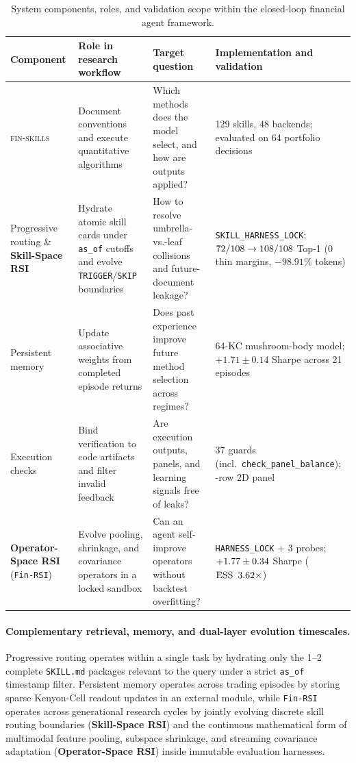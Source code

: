 \begin{table}[t]
\centering\small
\setlength{\tabcolsep}{5pt}
\begin{tabular}{p{}p{}p{}p{}}
\toprule
Component & Role in research workflow & Target question & Implementation and validation \\
\midrule
\textsc{fin-skills} & Document conventions and execute quantitative algorithms &
Which methods does the model select, and how are outputs applied? &
129 skills, 48 backends; evaluated on 64 portfolio decisions \\
Progressive routing \& \textbf{Skill-Space RSI} & Hydrate atomic skill cards under \texttt{as\_of} cutoffs and evolve \texttt{TRIGGER}/\texttt{SKIP} boundaries &
How to resolve umbrella-vs.-leaf collisions and future-document leakage? &
\texttt{SKILL\_HARNESS\_LOCK}; $72{}/108 \rightarrow 108{}/108$ Top-1 ($0$ thin margins, $-98.91\%$ tokens) \\
Persistent memory & Update associative weights from completed episode returns &
Does past experience improve future method selection across regimes? &
64-KC mushroom-body model; $+1.71 \pm 0.14$ Sharpe across 21 episodes \\
Execution checks & Bind verification to code artifacts and filter invalid feedback &
Are execution outputs, panels, and learning signals free of leaks? &
37 guards (incl.\ \texttt{check\_\-panel\_\-balance}); \PanelBalancedRows{}-row 2D panel \\
\textbf{Operator-Space RSI} (\texttt{Fin-RSI}) & Evolve pooling, shrinkage, and covariance operators in a locked sandbox &
Can an agent self-improve operators without backtest overfitting? &
\texttt{HARNESS\_LOCK} + 3 probes; $+1.77{} \pm 0.34{}$ Sharpe ($\operatorname{ESS}\ \RSIESSRatio{}\times$) \\
\bottomrule
\end{tabular}
\caption{System components, roles, and validation scope within the closed-loop financial agent framework.}
\label{tab:framework}
\end{table}

\paragraph{Complementary retrieval, memory, and dual-layer evolution timescales.}
Progressive routing operates within a single task by hydrating only the 1--2 complete
\texttt{SKILL.md} packages relevant to the query under a strict \texttt{as\_of} timestamp filter.
Persistent memory operates across trading episodes by storing sparse Kenyon-Cell readout updates
in an external module, while \texttt{Fin-RSI} operates across generational research cycles by
jointly evolving discrete skill routing boundaries (\textbf{Skill-Space RSI}) and the continuous
mathematical form of multimodal feature pooling, subspace shrinkage, and streaming covariance
adaptation (\textbf{Operator-Space RSI}) inside immutable evaluation harnesses.

